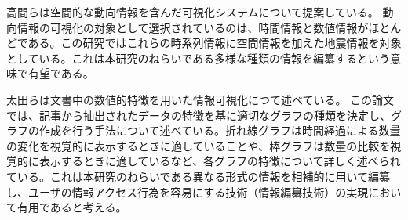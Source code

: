 \documentclass{matsushita-zemi}
\begin{document}
高間らは空間的な動向情報を含んだ可視化システムについて提案している\cite{SpaceTrendInformation}。
動向情報の可視化の対象として選択されているのは、時間情報と数値情報がほとんどである。この研究ではこれらの時系列情報に空間情報を加えた地震情報を対象としている。これは本研究のねらいである多様な種類の情報を編纂するという意味で有望である。


太田らは文書中の数値的特徴を用いた情報可視化につて述べている\cite{numerical_features}。
この論文では、記事から抽出されたデータの特徴を基に適切なグラフの種類を決定し、グラフの作成を行う手法について述べている。折れ線グラフは時間経過による数量の変化を視覚的に表示するときに適していることや、棒グラフは数量の比較を視覚的に表示するときに適しているなど、各グラフの特徴について詳しく述べられている。これは本研究のねらいである異なる形式の情報を相補的に用いて編纂し、ユーザの情報アクセス行為を容易にする技術（情報編纂技術）の実現において有用であると考える。
\end{document}
